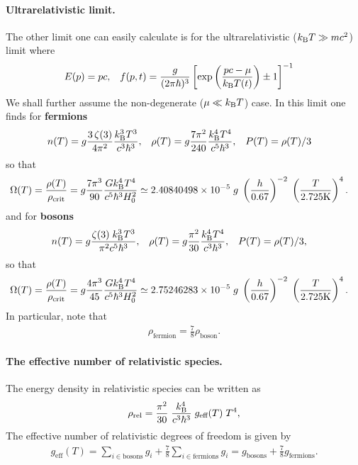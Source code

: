 \documentclass[a4paper]{article}
\begin{document}
\paragraph{Ultrarelativistic limit.} The other limit one can easily calculate is for the ultrarelativistic ($k_{\rm B}T\gg mc^2$) limit where 
\begin{align}
E(p) &= pc, & f(p,t) &= \frac{g}{(2\pi \hbar)^3}\left[\exp\left(\frac{pc-\mu}{k_{\rm B}T(t)}\right)\pm 1\right]^{-1}
\end{align}
We shall further assume the non-degenerate ($\mu\ll k_{\rm B}T$) case. In this limit one finds for \textbf{fermions}
\begin{align}
n(T) &= g\frac{3\,\zeta(3)}{4\pi^2}\frac{k_{\rm B}^3T^3}{c^3\hbar^3}, & \rho(T)& =g\frac{7\pi^2}{240}\frac{k_{\rm B}^4 T^4}{c^5\hbar^3}, & P(T) &= \rho(T)/3
\end{align}
so that
\begin{align}
\Omega(T) &= \frac{\rho(T)}{\rho_{\rm crit}} = g\frac{7\pi^3}{90}\frac{G k_{\rm B}^4 T^4}{c^5\hbar^3 H_0^2} \simeq 2.40840498\times10^{-5} \;g\;\left(\frac{h}{0.67}\right)^{-2}\;\left(\frac{T}{2.725 {\rm K}}\right)^4.
\end{align}
and for \textbf{bosons}
\begin{align}
n(T) &= g\frac{ \zeta (3)\;k_{\rm B}^3 T^3}{ \pi ^2 c^5 \hbar^3},& \rho(T)&=g\frac{\pi^2}{30}\frac{k_{\rm B}^4T^4}{c^3\hbar^3}, & P(T) &= \rho(T)/3,
\end{align}
so that
\begin{align}
\Omega(T) &= \frac{\rho(T)}{\rho_{\rm crit}} = g\frac{4\pi^3  }{45  }\frac{G k_{\rm B}^4T^4}{c^5\hbar^3H_0^2}\simeq 2.75246283\times10^{-5} \;g\;\left(\frac{h}{0.67}\right)^{-2}\;\left(\frac{T}{2.725 {\rm K}}\right)^4.
\end{align}
In particular, note that 
\begin{align}
  \rho_\text{fermion} = \frac{7}{8}\rho_\text{boson}.
\end{align}
\paragraph{The effective number of relativistic species.} The energy density in relativistic species can be written as
\begin{align}
  \rho_\text{rel} = \frac{\pi^2}{30}\;\frac{k_{\rm B}^4}{c^3\hbar^3}\;g_\text{eff}(T)\; T^4,
\end{align}
The effective number of relativistic degrees of freedom is given by
\begin{align}
  g_\text{eff}(T) = \sum_{i\in\text{bosons}}g_i + \frac{7}{8}\sum_{i\in\text{fermions}}g_i =g_\text{bosons} + \frac{7}{8} g_\text{fermions}.
\end{align}
\end{document}
